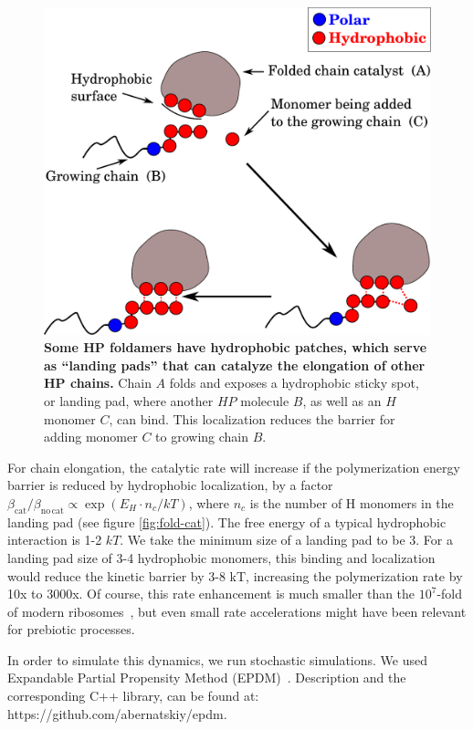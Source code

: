 \documentclass[journal=jacsat,manuscript=article,layout=twocolumn]{achemso}
\begin{document}
   \begin{figure}[ht!]
  \centering
  \includegraphics[width=0.8\columnwidth]{pictures/hp-catalysis.pdf} 
  \caption{\footnotesize{\textbf{Some HP foldamers have hydrophobic patches, which serve as 
``landing pads'' that can catalyze the elongation of other HP chains.}  Chain $A$ folds and 
exposes a hydrophobic sticky spot, or landing pad, where another $HP$ molecule $B$, as well as an 
$H$ monomer 
$C$, can bind.  This localization reduces the barrier for adding monomer $C$ to growing chain 
$B$.}}
  \label{fig:hp-catalysis}
\end{figure} 

 For chain elongation, the catalytic rate will increase if the polymerization energy barrier is 
reduced by hydrophobic localization, by a factor $\beta_\mathrm{cat}/ \beta_\mathrm{no\,cat} 
\propto \exp(E_{H}\cdot n_{c}/kT)$, where $n_c$ is the number of H monomers in the landing pad (see 
figure \ref{fig:fold-cat}).  The free energy of a typical hydrophobic interaction 
is 1-2 $kT$.  We take the minimum size of a landing pad to be 3.  For a landing pad size of 3-4 
hydrophobic monomers, this binding and localization would reduce the kinetic barrier by 3-8 kT, 
increasing the polymerization rate by 10x to 3000x.  Of course, this rate enhancement is much 
smaller than the $10^7$-fold of modern ribosomes~\cite{Sievers2004a}, but even small rate 
accelerations might have been relevant for prebiotic processes.

In order to simulate this dynamics, we run stochastic simulations. 
We used Expandable Partial Propensity Method (EPDM)~\cite{Guseva2016b}. Description and the 
corresponding C++ library, can be found at: 
https://github.com/abernatskiy/epdm. 
  
\end{document}
